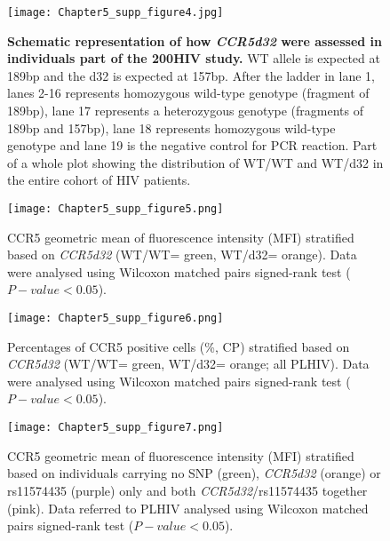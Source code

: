 \documentclass{book}
\begin{document}
\begin{refsection}
\begin{figure}[H] %
  \centering
  \texttt{[image: Chapter5\_supp\_figure4.jpg]}
  \caption{\label{fig:chp5supfig4} \textbf{Schematic representation of how \textit{CCR5d32} were assessed in individuals part of the 200HIV study.}
  WT allele is expected at 189bp and the d32 is expected at 157bp.
  After the ladder in lane 1, lanes 2-16 represents homozygous wild-type genotype (fragment of 189bp), lane 17 represents a heterozygous genotype (fragments of 189bp and 157bp), lane 18 represents homozygous wild-type genotype and lane 19 is the negative control for PCR reaction.
  Part of a whole plot showing the distribution of WT/WT and WT/d32 in the entire cohort of HIV patients.
  }
\end{figure}

\begin{landscape}
\begin{figure}[H] %
  \centering
  \texttt{[image: Chapter5\_supp\_figure5.png]}
  \caption{\label{fig:chp5supfig5}
    CCR5 geometric mean of fluorescence intensity (MFI) stratified based on \textit{CCR5d32} (WT/WT= green, WT/d32= orange).
    Data were analysed using Wilcoxon matched pairs signed-rank test ($P-value < 0.05$).
  }
\end{figure}

\begin{figure}[H] %
  \centering
  \texttt{[image: Chapter5\_supp\_figure6.png]}
  \caption{\label{fig:chp5supfig6}
    Percentages of CCR5 positive cells (\%, CP) stratified based on \textit{CCR5d32} (WT/WT= green, WT/d32= orange; all PLHIV).
    Data were analysed using Wilcoxon matched pairs signed-rank test ($P-value < 0.05$).
  }
\end{figure}

\begin{figure}[H] %
  \centering
  \texttt{[image: Chapter5\_supp\_figure7.png]}
  \caption{\label{fig:chp5supfig7}
    CCR5 geometric mean of fluorescence intensity (MFI) stratified based on individuals carrying no SNP (green), \textit{CCR5d32} (orange) or rs11574435 (purple) only and both \textit{CCR5d32}/rs11574435 together (pink).
    Data referred to PLHIV analysed using Wilcoxon matched pairs signed-rank test ($P-value < 0.05$).
  }
\end{figure}
\end{landscape}


\end{refsection}
\end{document}
